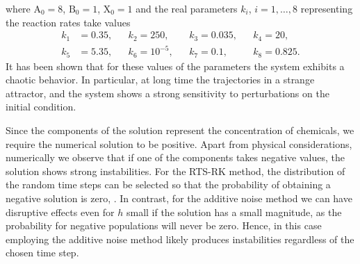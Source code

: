 \documentclass[10pt]{article}
\begin{document}
where $\mathrm{A}_0 = 8$, $\mathrm{B}_0 = 1$, $\mathrm{X}_0 = 1$ and the real parameters $k_i$, $i = 1, \ldots, 8$ representing the reaction rates take values
\begin{equation}
\begin{aligned}
k_1 &= 0.35, &&k_2 = 250, &&k_3 = 0.035, &&k_4 = 20,\\
k_5 &= 5.35, &&k_6 = 10^{-5}, &&k_7 = 0.1, &&k_8 = 0.825.
\end{aligned}
\end{equation}            
It has been shown \cite{Ols83} that for these values of the parameters the system exhibits a chaotic behavior. In particular, at long time the trajectories  in a strange attractor, and the system shows a strong sensitivity to perturbations on the initial condition. 

Since the components of the solution represent the concentration of chemicals, we require the numerical solution to be positive. Apart from physical considerations, numerically we observe that if one of the components takes negative values, the solution shows strong instabilities. For the RTS-RK method, the distribution of the random time steps can be selected so that the probability of obtaining a negative solution is zero, . In contrast, for the additive noise method we can have disruptive effects even for $h$ small if the solution has a small magnitude, as the probability for negative populations will never be zero. Hence, in this case employing the additive noise method likely produces instabilities regardless of the chosen time step.
\end{document}
